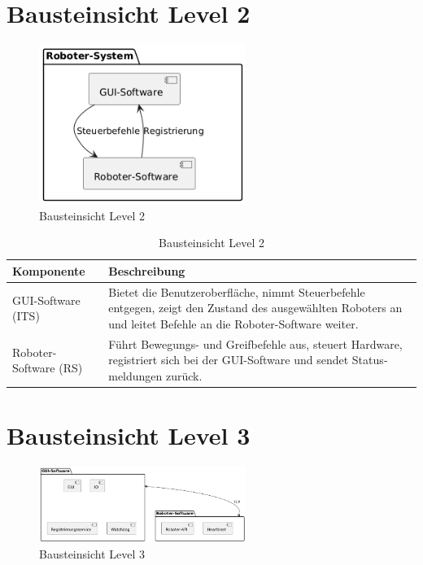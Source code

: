 \section{Bausteinsicht Level 2}
\begin{figure}[h] %
    \centering
    \includegraphics[width=0.6\textwidth]{diagrams/baustein_lvl_2.png}
    \caption{Bausteinsicht Level 2}
\end{figure}

\begin{table}[h!]
\centering
\begin{tabular}{|p{4cm}|p{9cm}|}
\hline
\textbf{Komponente} & \textbf{Beschreibung} \\ \hline
GUI-Software (ITS) & Bietet die Benutzeroberfläche, nimmt Steuerbefehle entgegen, zeigt den Zustand des ausgewählten Roboters an und leitet Befehle an die Roboter-Software weiter. \\ \hline
Roboter-Software (RS) & Führt Bewegungs- und Greifbefehle aus, steuert Hardware, registriert sich bei der GUI-Software und sendet Status­meldungen zurück. \\ \hline
\end{tabular}
\caption{Bausteinsicht Level 2}
\label{tab:lvl2}
\end{table}
\newpage

\section{Bausteinsicht Level 3}
\begin{figure}[h] %
    \centering
    \includegraphics[width=0.6\textwidth]{diagrams/baustein_lvl_3.png}
    \caption{Bausteinsicht Level 3}
\end{figure}

